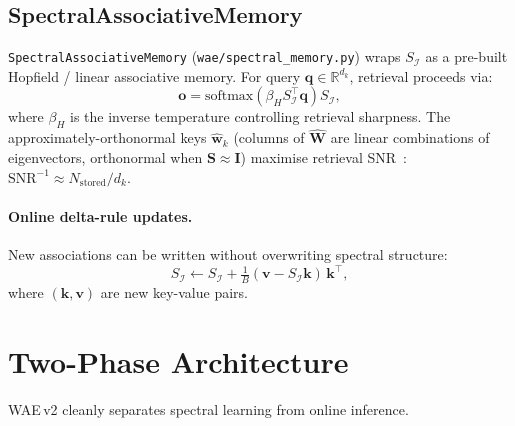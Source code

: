 \documentclass[11pt,a4paper]{article}
\newcommand{\R}{\mathbb{R}}
\newcommand{\I}{\mathcal{I}}
\newcommand{\bS}{\bm{S}}
\newcommand{\bW}{\bm{W}}
\begin{document}
\subsection{SpectralAssociativeMemory}
\label{sec:assoc_mem}

\texttt{SpectralAssociativeMemory} (\texttt{wae/spectral\_memory.py}) wraps
$S_{\I}$ as a pre-built Hopfield / linear associative memory.  For query
$\bm{q}\in\R^{d_k}$, retrieval proceeds via:
\begin{equation}
  \bm{o} = \mathrm{softmax}\!\left(\beta_H S_{\I}^\top \bm{q}\right) S_{\I},
  \label{eq:hopfield}
\end{equation}
where $\beta_H$ is the inverse temperature controlling retrieval sharpness.
The approximately-orthonormal keys $\hat{\bm{w}}_k$ (columns of $\hat{\bW}$
are linear combinations of eigenvectors, orthonormal when $\bS\approx\bm{I}$)
maximise retrieval SNR~\citep{ramsauer2020hopfield}:
$\mathrm{SNR}^{-1}\approx N_{\mathrm{stored}}/d_k$.

\paragraph{Online delta-rule updates.}
New associations can be written without overwriting spectral structure:
\begin{equation}
  S_{\I} \leftarrow S_{\I} + \tfrac{1}{B}(\bm{v}-S_{\I}\bm{k})\,\bm{k}^\top,
  \label{eq:delta_rule}
\end{equation}
where $(\bm{k},\bm{v})$ are new key-value pairs.

\section{Two-Phase Architecture}
\label{sec:two_phase}

WAE\,v2 cleanly separates spectral learning from online inference.
\end{document}
